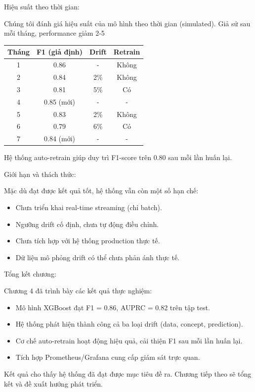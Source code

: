 Hiệu suất theo thời gian:

Chúng tôi đánh giá hiệu suất của mô hình theo thời gian (simulated). Giả sử sau mỗi tháng, performance giảm 2-5%

\begin{center}
\begin{tabular}{c|c|c|c}
    \textbf{Tháng} & \textbf{F1 (giả định)} & \textbf{Drift} & \textbf{Retrain} \\
    \hline
    1 & 0.86 & - & Không \\
    2 & 0.84 & 2\% & Không \\
    3 & 0.81 & 5\% & Có \\
    4 & 0.85 (mới) & - & - \\
    5 & 0.83 & 2\% & Không \\
    6 & 0.79 & 6\% & Có \\
    7 & 0.84 (mới) & - & - \\
\end{tabular}
\end{center}

Hệ thống auto-retrain giúp duy trì F1-score trên 0.80 sau mỗi lần huấn lại.

Giới hạn và thách thức:

Mặc dù đạt được kết quả tốt, hệ thống vẫn còn một số hạn chế:
\begin{itemize}
    \item Chưa triển khai real-time streaming (chỉ batch).
    \item Ngưỡng drift cố định, chưa tự động điều chỉnh.
    \item Chưa tích hợp với hệ thống production thực tế.
    \item Dữ liệu mô phỏng drift có thể chưa phản ánh thực tế.
\end{itemize}

Tổng kết chương:

Chương 4 đã trình bày các kết quả thực nghiệm:
\begin{itemize}
    \item Mô hình XGBoost đạt F1 = 0.86, AUPRC = 0.82 trên tập test.
    \item Hệ thống phát hiện thành công cả ba loại drift (data, concept, prediction).
    \item Cơ chế auto-retrain hoạt động hiệu quả, cải thiện F1 sau mỗi lần huấn lại.
    \item Tích hợp Prometheus/Grafana cung cấp giám sát trực quan.
\end{itemize}

Kết quả cho thấy hệ thống đã đạt được mục tiêu đề ra. Chương tiếp theo sẽ tổng kết và đề xuất hướng phát triển.